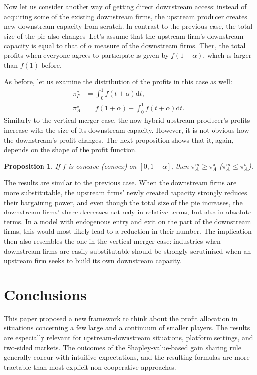 \documentclass[a4paper]{article}
\newtheorem{proposition}{Proposition}
\newcommand{\dt}{\mathrm{d}t}
\begin{document}
Now let us consider another way of getting direct downstream access: instead of acquiring some of the existing downstream firms, the upstream producer creates new downstream capacity from scratch.
In contrast to the previous case, the total size of the pie also changes.
Let's assume that the upstream firm's downstream capacity is equal to that of $\alpha$ measure of the downstream firms.
Then, the total profits when everyone agrees to participate is given by $f(1 + \alpha)$, which is larger than $f(1)$ before.

As before, let us examine the distribution of the profits in this case as well:
\begin{align*}
    \pi_{P}^c & = \int_0^1 f(t + \alpha) \dt, \\
    \pi_{A}^c & = f(1 + \alpha) - \int_0^1 f(t + \alpha) \dt .
\end{align*}
Similarly to the vertical merger case, the now hybrid upstream producer's profits increase with the size of its downstream capacity.
However, it is not obvious how the downstream's profit changes.
The next proposition shows that it, again, depends on the shape of the profit function.
\begin{proposition}
    \label{prop:downstream_capacity}
    If $f$ is concave (convex) on $[0, 1+\alpha]$, then $\pi_A^m \geq \pi_A^b$ ($\pi_A^m \leq \pi_A^b$). 
\end{proposition}

The results are similar to the previous case.
When the downstream firms are more substitutable, the upstream firms' newly created capacity strongly reduces their bargaining power, and even though the total size of the pie increases, the downstream firms' share decreases not only in relative terms, but also in absolute terms.
In a model with endogenous entry and exit on the part of the downstream firms, this would most likely lead to a reduction in their number.
The implication then also resembles the one in the vertical merger case: industries when downstream firms are easily substitutable should be strongly scrutinized when an upstream firm seeks to build its own downstream capacity.


\section{Conclusions}

This paper proposed a new framework to think about the profit allocation in situations concerning a few large and a continuum of smaller players.
The results are especially relevant for upstream-downstream situations, platform settings, and two-sided markets.
The outcomes of the Shapley-value-based gain sharing rule generally concur with intuitive expectations, and the resulting formulas are more tractable than most explicit non-cooperative approaches.
\end{document}
